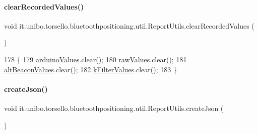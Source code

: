 \paragraph{\texorpdfstring{clear\+Recorded\+Values()}{clearRecordedValues()}}
{\footnotesize\ttfamily void it.\+unibo.\+torsello.\+bluetoothpositioning.\+util.\+Report\+Utils.\+clear\+Recorded\+Values (\begin{DoxyParamCaption}{ }\end{DoxyParamCaption})}


\begin{DoxyCode}
178                                       \{
179         \hyperlink{classit_1_1unibo_1_1torsello_1_1bluetoothpositioning_1_1util_1_1ReportUtils_a3557dcc1662461b46fcd4d18eee9780e_a3557dcc1662461b46fcd4d18eee9780e}{arduinoValues}.clear();
180         \hyperlink{classit_1_1unibo_1_1torsello_1_1bluetoothpositioning_1_1util_1_1ReportUtils_adbe56bea0813a48932ef94b8b27c3314_adbe56bea0813a48932ef94b8b27c3314}{rawValues}.clear();
181         \hyperlink{classit_1_1unibo_1_1torsello_1_1bluetoothpositioning_1_1util_1_1ReportUtils_a6e72cc0d840390d44e6cbccece68e240_a6e72cc0d840390d44e6cbccece68e240}{altBeaconValues}.clear();
182         \hyperlink{classit_1_1unibo_1_1torsello_1_1bluetoothpositioning_1_1util_1_1ReportUtils_a9a40344497c5522bbc90f03581c2713a_a9a40344497c5522bbc90f03581c2713a}{kFilterValues}.clear();
183     \}
\end{DoxyCode}
\hypertarget{classit_1_1unibo_1_1torsello_1_1bluetoothpositioning_1_1util_1_1ReportUtils_a9157e4b2593b8ceaae5448cfff96f4c4_a9157e4b2593b8ceaae5448cfff96f4c4}{}\label{classit_1_1unibo_1_1torsello_1_1bluetoothpositioning_1_1util_1_1ReportUtils_a9157e4b2593b8ceaae5448cfff96f4c4_a9157e4b2593b8ceaae5448cfff96f4c4} 
\paragraph{\texorpdfstring{create\+Json()}{createJson()}}
{\footnotesize\ttfamily void it.\+unibo.\+torsello.\+bluetoothpositioning.\+util.\+Report\+Utils.\+create\+Json (\begin{DoxyParamCaption}{ }\end{DoxyParamCaption})}


